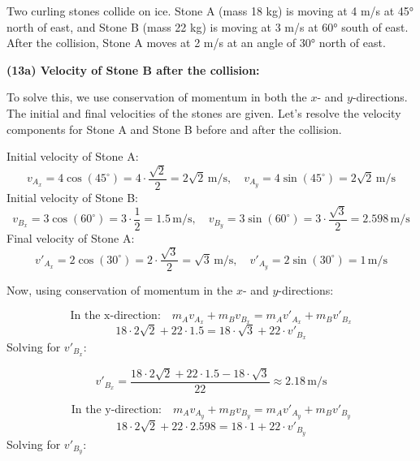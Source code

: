\documentclass[addpoints]{exam}
\begin{document}
\begin{questions}
\begin{questions}
\question Two curling stones collide on ice. Stone A (mass 18 kg) is moving at 4 m/s at 45° north of east, and Stone B (mass 22 kg) is moving at 3 m/s at 60° south of east. After the collision, Stone A moves at 2 m/s at an angle of 30° north of east. 
\begin{solution}[6cm]
\textbf{(13a) Velocity of Stone B after the collision:}  

To solve this, we use conservation of momentum in both the \( x \)- and \( y \)-directions. The initial and final velocities of the stones are given. Let’s resolve the velocity components for Stone A and Stone B before and after the collision.

Initial velocity of Stone A:
\[
v_{A_x} = 4 \cos(45^\circ) = 4 \cdot \frac{\sqrt{2}}{2} = 2\sqrt{2} \, \text{m/s}, \quad v_{A_y} = 4 \sin(45^\circ) = 2\sqrt{2} \, \text{m/s}
\]  
Initial velocity of Stone B:
\[
v_{B_x} = 3 \cos(60^\circ) = 3 \cdot \frac{1}{2} = 1.5 \, \text{m/s}, \quad v_{B_y} = 3 \sin(60^\circ) = 3 \cdot \frac{\sqrt{3}}{2} = 2.598 \, \text{m/s}
\]  
Final velocity of Stone A:
\[
v'_{A_x} = 2 \cos(30^\circ) = 2 \cdot \frac{\sqrt{3}}{2} = \sqrt{3} \, \text{m/s}, \quad v'_{A_y} = 2 \sin(30^\circ) = 1 \, \text{m/s}
\]  

Now, using conservation of momentum in the \( x \)- and \( y \)-directions:

\[
\text{In the x-direction:} \quad m_A v_{A_x} + m_B v_{B_x} = m_A v'_{A_x} + m_B v'_{B_x}
\]  
\[
18 \cdot 2\sqrt{2} + 22 \cdot 1.5 = 18 \cdot \sqrt{3} + 22 \cdot v'_{B_x}
\]  
Solving for \( v'_{B_x} \):

\[
v'_{B_x} = \frac{18 \cdot 2\sqrt{2} + 22 \cdot 1.5 - 18 \cdot \sqrt{3}}{22} \approx 2.18 \, \text{m/s}
\]

\[
\text{In the y-direction:} \quad m_A v_{A_y} + m_B v_{B_y} = m_A v'_{A_y} + m_B v'_{B_y}
\]  
\[
18 \cdot 2\sqrt{2} + 22 \cdot 2.598 = 18 \cdot 1 + 22 \cdot v'_{B_y}
\]  
Solving for \( v'_{B_y} \):


\end{solution}
\end{questions}
\end{questions}
\end{document}
